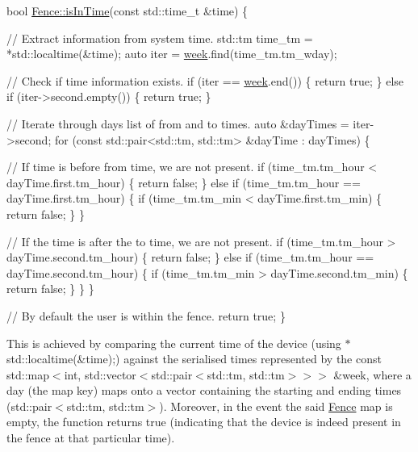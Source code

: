 \begin{DoxyCode}
\textcolor{keywordtype}{bool} \hyperlink{class_fence_a7695b0f94f461369703188a287a38ab4}{Fence::isInTime}(\textcolor{keyword}{const} std::time\_t &time) \{

    \textcolor{comment}{// Extract information from system time.}
    std::tm time\_tm = *std::localtime(&time);
    \textcolor{keyword}{auto} iter = \hyperlink{class_fence_ae589e973fa03316847aeceedd72e2b64}{week}.find(time\_tm.tm\_wday);

    \textcolor{comment}{// Check if time information exists.}
    \textcolor{keywordflow}{if} (iter == \hyperlink{class_fence_ae589e973fa03316847aeceedd72e2b64}{week}.end()) \{
        \textcolor{keywordflow}{return} \textcolor{keyword}{true};
    \} \textcolor{keywordflow}{else} \textcolor{keywordflow}{if} (iter->second.empty()) \{
        \textcolor{keywordflow}{return} \textcolor{keyword}{true};
    \}

    \textcolor{comment}{// Iterate through days list of from and to times.}
    \textcolor{keyword}{auto} &dayTimes = iter->second;
    \textcolor{keywordflow}{for} (\textcolor{keyword}{const} std::pair<std::tm, std::tm> &dayTime : dayTimes) \{

        \textcolor{comment}{// If time is before from time, we are not present.}
        \textcolor{keywordflow}{if} (time\_tm.tm\_hour < dayTime.first.tm\_hour) \{
            \textcolor{keywordflow}{return} \textcolor{keyword}{false};
        \} \textcolor{keywordflow}{else} \textcolor{keywordflow}{if} (time\_tm.tm\_hour == dayTime.first.tm\_hour) \{
            \textcolor{keywordflow}{if} (time\_tm.tm\_min < dayTime.first.tm\_min) \{
                \textcolor{keywordflow}{return} \textcolor{keyword}{false};
            \}
        \}

        \textcolor{comment}{// If the time is after the to time, we are not present.}
        \textcolor{keywordflow}{if} (time\_tm.tm\_hour > dayTime.second.tm\_hour) \{
            \textcolor{keywordflow}{return} \textcolor{keyword}{false};
        \} \textcolor{keywordflow}{else} \textcolor{keywordflow}{if} (time\_tm.tm\_hour == dayTime.second.tm\_hour) \{
            \textcolor{keywordflow}{if} (time\_tm.tm\_min > dayTime.second.tm\_min) \{
                \textcolor{keywordflow}{return} \textcolor{keyword}{false};
            \}
        \}
    \}

    \textcolor{comment}{// By default the user is within the fence.}
    \textcolor{keywordflow}{return} \textcolor{keyword}{true};
\}
\end{DoxyCode}
 This is achieved by comparing the current time of the device (using {\ttfamily $\ast$std\+::localtime(\&time);}) against the serialised times represented by the {\ttfamily const std\+::map$<$int, std\+::vector$<$std\+::pair$<$std\+::tm, std\+::tm$>$$>$$>$ \&week}, where a day (the map key) maps onto a vector containing the starting and ending times ({\ttfamily std\+::pair$<$std\+::tm, std\+::tm$>$}). Moreover, in the event the said \hyperlink{class_fence}{Fence} map is empty, the function returns true (indicating that the device is indeed present in the fence at that particular time).

